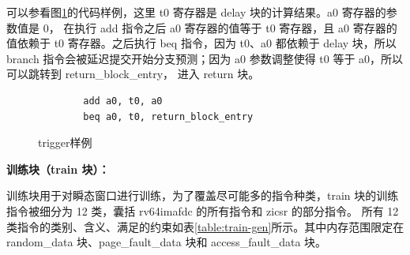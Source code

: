可以参看图\ref{code:trigger-example}的代码样例，这里 t0 寄存器是 delay 块的计算结果。a0 寄存器的参数值是 0，
在执行 add 指令之后 a0 寄存器的值等于 t0 寄存器，且 a0 寄存器的值依赖于 t0 寄存器。之后执行 beq 指令，因为 t0、a0 都依赖于
delay 块，所以 branch 指令会被延迟提交开始分支预测；因为 a0 参数调整使得 t0 等于 a0，所以可以跳转到 return\_block\_entry，
进入 return 块。\par

\begin{figure}[htbp]
    \centering
    \begin{verbatim}
        add a0, t0, a0
        beq a0, t0, return_block_entry
    \end{verbatim}
    \caption{trigger样例}
    \label{code:trigger-example}
\end{figure}

\textbf{训练块（train 块）：}\par
训练块用于对瞬态窗口进行训练，为了覆盖尽可能多的指令种类，train 块的训练指令被细分为 12 类，囊括 rv64imafdc 的所有指令和 zicsr 的部分指令。
所有 12 类指令的类别、含义、满足的约束如表\ref{table:train-gen}所示。其中内存范围限定在 random\_data 块、page\_fault\_data 块和 
access\_fault\_data 块。\par

